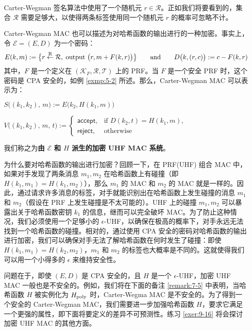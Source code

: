 Carter-Wegman 签名算法中使用了一个随机元 $r\in\mathcal{R}$。正如我们将要看到的，集合 $\mathcal{R}$ 需要足够大，以使得两条标签使用同一个随机元 $r$ 的概率可忽略不计。

\begin{snote}
Carter-Wegman MAC 也可以描述为对哈希函数的输出进行的一种加密。事实上，令 $\mathcal{E}=(E,D)$ 为一个密码：
\[
E(k,m):=\big\{r\overset{\rm R}\leftarrow\mathcal{R},\;\text{output }\big(r,m+F(k,r)\big)\big\}
\quad\quad\text{and}\quad\quad
D\big(k,(r,c)\big):=c-F(k,r)
\]
其中，$F$ 是一个定义在 $(\mathcal{K}_F,\mathcal{R},\mathcal{T})$ 上的 PRF。当 $F$ 是一个安全 PRF 时，这个密码是 CPA 安全的，如例 \ref{exmp:5-2} 所述。那么，Carter-Wegman MAC 可以表示为：

\vspace{5pt}

\hspace*{5pt} $S\big((k_1,k_2),\,m\big):=E\big(k_2,H(k_1,m)\big)$

\vspace{5pt}

\hspace*{5pt} $
V\big((k_1,k_2),\,m,\,t\big):=\left\{
\begin{array}{ll}
\mathsf{accept}, & \text{if }D(k_2,t)=H(k_1,m),\\
\mathsf{reject}, & \text{otherwise}
\end{array}
\right.
$

\vspace{8pt}

\noindent
我们称之为\textbf{由 $\mathcal{E}$ 和 $H$ 派生的加密 UHF MAC 系统}。

为什么要对哈希函数的输出进行加密？回顾一下，在 PRF(UHF) 组合 MAC 中，如果对手发现了两条消息 $m_1,m_2$ 在哈希函数上有碰撞（即 $H(k_1,m_1)=H(k_1,m_2)$），那么 $m_1$ 的 MAC 和 $m_2$ 的 MAC 就是一样的。因此，通过请求许多消息的标签，对手就能识别出在哈希函数上发生碰撞的消息 $m_1$ 和 $m_2$（假设在 PRF 上发生碰撞是不太可能的）。UHF 上的碰撞 $m_1,m_2$ 可以暴露出关于哈希函数密钥 $k_1$ 的信息，继而可以完全破坏 MAC。为了防止这种情况，我们必须使用一个足够小的 $\epsilon$-UHF，以确保在极高的概率下，对手永远无法找到一个哈希函数的碰撞。相对的，通过使用 CPA 安全的密码对哈希函数的输出进行加密，我们可以确保对手无法了解哈希函数在何时发生了碰撞：即使 $H(k_1,m_1)=H(k_2,m_2)$，$m_1$ 和 $m_2$ 的标签也大概率是不同的。这就使得我们可以用一个小得多的 $\epsilon$ 来维持安全性。

问题在于，即使 $(E,D)$ 是 CPA 安全的，且 $H$ 是一个 $\epsilon$-UHF，加密 UHF MAC 一般也是不安全的。例如，我们将在下面的备注 \ref{remark:7-5} 中表明，当哈希函数 $H$ 被实例化为 $H_{\rm poly}$ 时，Carter-Wegma MAC 是不安全的。为了得到一个安全的 Carter-Wegman MAC，我们需要进一步加强哈希函数 $H$，要求它满足一个更强的属性，即下面将要定义的差异不可预测性。练习 \ref{exer:9-16} 将会探讨加密 UHF MAC 的其他方面。
\end{snote}

